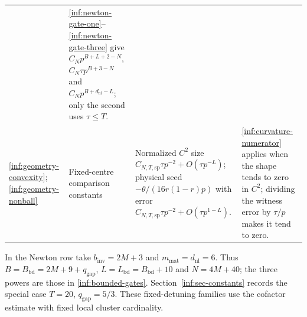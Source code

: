 \begin{lemma}
\begin{longtable}{@{}>{\raggedright\arraybackslash}p{}>{\raggedright\arraybackslash}p{}>{\raggedright\arraybackslash}p{}>{\raggedright\arraybackslash}p{}@{}}
& \eqref{inf:newton-gate-one}--\eqref{inf:newton-gate-three} give
$C_Np^{B+L+2-N}$, $C_N\tau p^{B+3-N}$ and
$C_Np^{B+d_{\mathrm{nl}}-L}$; only the second uses $\tau\le T$.\\
\ref{inf:geometry-convexity};
\ref{inf:geometry-nonball}
& Fixed-centre comparison constants
& Normalized $C^2$ size
$C_{N,T,\mathrm{sp}}\tau p^{-2}+O(\tau p^{-L})$;
physical seed $-\theta/(16r(1-r)p)$ with error
$C_{N,T,\mathrm{sp}}\tau p^{-2}+O(\tau p^{1-L})$.
& \eqref{inf:curvature-numerator} applies when the shape tends
to zero in $C^2$; dividing the witness error by $\tau/p$
makes it tend to zero.\\
\bottomrule
\end{longtable}
\endgroup
In the Newton row take $b_{\mathrm{inv}}=2M+3$ and
$m_{\mathrm{mat}}=d_{\mathrm{nl}}=6$. Thus
$B=B_{\mathrm{bd}}=2M+9+q_{\mathrm{gap}}$,
$L=L_{\mathrm{bd}}=B_{\mathrm{bd}}+10$ and $N=4M+40$;
the three powers are those in \eqref{inf:bounded-gates}.
Section~\ref{inf:sec-constants} records the special case
$T=20$, $q_{\mathrm{gap}}=5/3$.
These fixed-detuning families use the cofactor estimate
with fixed local cluster cardinality.
\end{lemma}
